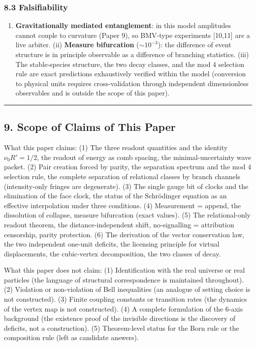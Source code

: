 \documentclass[
]{ltjsarticle}
\providecommand{\tightlist}{%
  \setlength{\itemsep}{0pt}\setlength{\parskip}{0pt}}
\begin{document}
\subsubsection{8.3 Falsifiability}\label{falsifiability}

\begin{enumerate}
\def\labelenumi{(\roman{enumi})}
\tightlist
\item
  \textbf{Gravitationally mediated entanglement}: in this model
  amplitudes cannot couple to curvature (Paper 9), so BMV-type
  experiments {[}10,11{]} are a live arbiter. (ii) \textbf{Measure
  bifurcation} (\(\sim10^{-3}\)): the difference of event structure is
  in principle observable as a difference of branching statistics. (iii)
  The stable-species structure, the two decay classes, and the mod 4
  selection rule are exact predictions exhaustively verified within the
  model (conversion to physical units requires cross-validation through
  independent dimensionless observables and is outside the scope of this
  paper).
\end{enumerate}

\begin{center}\rule{0.5\linewidth}{0.5pt}\end{center}

\subsection{9. Scope of Claims of This
Paper}\label{scope-of-claims-of-this-paper}

What this paper claims: (1) The three readout quantities and the
identity \(\nu_0R'=1/2\), the readout of energy as comb spacing, the
minimal-uncertainty wave packet. (2) Pair creation forced by parity, the
separation spectrum and the mod 4 selection rule, the complete
separation of relational classes by branch channels (intensity-only
fringes are degenerate). (3) The single gauge bit of clocks and the
elimination of the face clock, the status of the Schrödinger equation as
an effective interpolation under three conditions. (4) Measurement =
append, the dissolution of collapse, measure bifurcation (exact values).
(5) The relational-only readout theorem, the distance-independent shift,
no-signalling = attribution censorship, parity protection. (6) The
derivation of the vector conservation law, the two independent one-unit
deficits, the licensing principle for virtual displacements, the
cubic-vertex decomposition, the two classes of decay.

What this paper does not claim: (1) Identification with the real
universe or real particles (the language of structural correspondence is
maintained throughout). (2) Violation or non-violation of Bell
inequalities (an analogue of setting choice is not constructed). (3)
Finite coupling constants or transition rates (the dynamics of the
vertex map is not constructed). (4) A complete formulation of the 6-axis
background (the existence proof of the invisible directions is the
discovery of deficits, not a construction). (5) Theorem-level status for
the Born rule or the composition rule (left as candidate answers).
\end{document}
